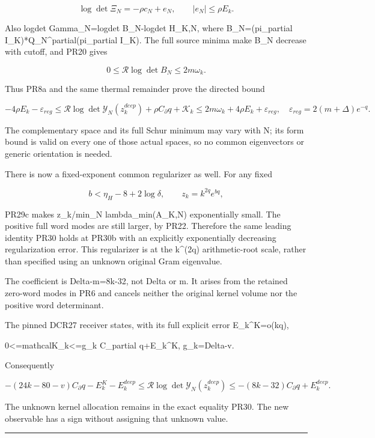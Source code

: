 \documentclass[11pt]{article}
\begin{document}
\[
\log\det\Xi_N=-\rho c_N+e_N,\qquad |e_N|\le\rho E_k.
\]

Also logdet Gamma\_N=logdet B\_N-logdet H\_K,N, where B\_N=(pi\_partial I\_K)*Q\_N\^{}partial(pi\_partial I\_K). The full source minima make B\_N decrease with cutoff, and PR20 gives

\[
0\le\mathcal R\log\det B_N\le2m\omega_k.
\]

Thus PR8a and the same thermal remainder prove the directed bound

\[
-4\rho E_k-\varepsilon_{reg}
\le\mathcal R\log\det\mathscr Y_N(z_k^{deep})+\rho C_\partial q+\mathcal K_k
\le2m\omega_k+4\rho E_k+\varepsilon_{reg},
\quad\varepsilon_{reg}=2(m+\Delta)e^{-q}.
\tag{PR30a}
\]

The complementary space and its full Schur minimum may vary with N; its form bound is valid on every one of those actual spaces, so no common eigenvectors or generic orientation is needed.

There is now a fixed-exponent common regularizer as well. For any fixed

\[
b<\eta_H-8+2\log\delta,\qquad z_k=k^{2q}e^{bq},
\tag{PR30b}
\]

PR29c makes z\_k/min\_N lambda\_min(A\_K,N) exponentially small. The positive full word modes are still larger, by PR22. Therefore the same leading identity PR30 holds at PR30b with an explicitly exponentially decreasing regularization error. This regularizer is at the k\^{}(2q) arithmetic-root scale, rather than specified using an unknown original Gram eigenvalue.

The coefficient is Delta-m=8k-32, not Delta or m. It arises from the retained zero-word modes in PR6 and cancels neither the original kernel volume nor the positive word determinant.

The pinned DCR27 receiver states, with its full explicit error E\_k\^{}K=o(kq),

0\textless=mathcalK\_k\textless=g\_k C\_partial q+E\_k\^{}K, g\_k=Delta-v.

Consequently

\[
\boxed{
-(24k-80-v)C_\partial q-E_k^K-E_k^{deep}
\le\mathcal R\log\det\mathscr Y_N(z_k^{deep})
\le-(8k-32)C_\partial q+E_k^{deep}.
}
\tag{PR31}
\]

The unknown kernel allocation remains in the exact equality PR30. The new observable has a sign without assigning that unknown value.

\begin{center}\rule{0.5\linewidth}{0.5pt}\end{center}
\end{document}
